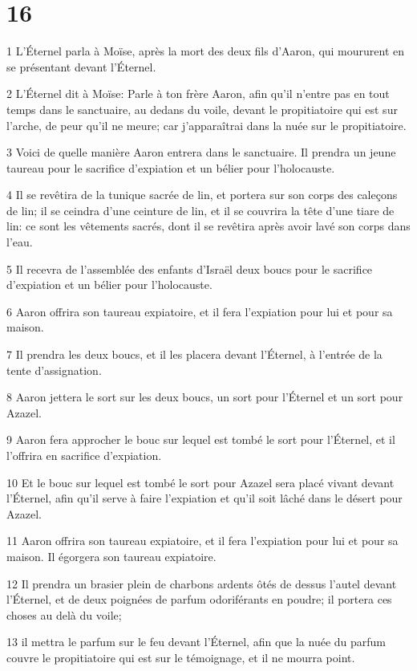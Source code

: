 \chapter{16}

\par 1 L'Éternel parla à Moïse, après la mort des deux fils d'Aaron, qui moururent en se présentant devant l'Éternel.
\par 2 L'Éternel dit à Moïse: Parle à ton frère Aaron, afin qu'il n'entre pas en tout temps dans le sanctuaire, au dedans du voile, devant le propitiatoire qui est sur l'arche, de peur qu'il ne meure; car j'apparaîtrai dans la nuée sur le propitiatoire.
\par 3 Voici de quelle manière Aaron entrera dans le sanctuaire. Il prendra un jeune taureau pour le sacrifice d'expiation et un bélier pour l'holocauste.
\par 4 Il se revêtira de la tunique sacrée de lin, et portera sur son corps des caleçons de lin; il se ceindra d'une ceinture de lin, et il se couvrira la tête d'une tiare de lin: ce sont les vêtements sacrés, dont il se revêtira après avoir lavé son corps dans l'eau.
\par 5 Il recevra de l'assemblée des enfants d'Israël deux boucs pour le sacrifice d'expiation et un bélier pour l'holocauste.
\par 6 Aaron offrira son taureau expiatoire, et il fera l'expiation pour lui et pour sa maison.
\par 7 Il prendra les deux boucs, et il les placera devant l'Éternel, à l'entrée de la tente d'assignation.
\par 8 Aaron jettera le sort sur les deux boucs, un sort pour l'Éternel et un sort pour Azazel.
\par 9 Aaron fera approcher le bouc sur lequel est tombé le sort pour l'Éternel, et il l'offrira en sacrifice d'expiation.
\par 10 Et le bouc sur lequel est tombé le sort pour Azazel sera placé vivant devant l'Éternel, afin qu'il serve à faire l'expiation et qu'il soit lâché dans le désert pour Azazel.
\par 11 Aaron offrira son taureau expiatoire, et il fera l'expiation pour lui et pour sa maison. Il égorgera son taureau expiatoire.
\par 12 Il prendra un brasier plein de charbons ardents ôtés de dessus l'autel devant l'Éternel, et de deux poignées de parfum odoriférants en poudre; il portera ces choses au delà du voile;
\par 13 il mettra le parfum sur le feu devant l'Éternel, afin que la nuée du parfum couvre le propitiatoire qui est sur le témoignage, et il ne mourra point.
